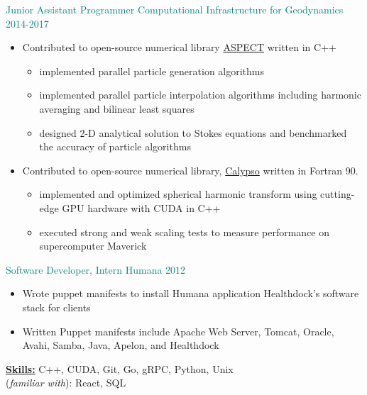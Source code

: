 \documentclass[11pt]{ltxdoc}
\begin{document}
	{\textcolor{teal}{Junior Assistant Programmer} \hfill \textcolor{teal}{Computational Infrastructure for Geodynamics} \hfill \textcolor{teal}{2014-2017}}

      \begin{itemize}
      	
        \item Contributed to open-source numerical library \href{https://github.com/geodynamics/aspect}{ASPECT} written in C++
        
            \begin{itemize}        
            	\item implemented parallel particle generation algorithms
            	\item implemented parallel particle interpolation algorithms including harmonic averaging and bilinear least squares
            	\item designed 2-D analytical solution to Stokes equations and benchmarked the accuracy of particle algorithms
			\end{itemize}
      
		\item Contributed to open-source numerical library,
		\href{https://geodynamics.org/cig/software/calypso/}{Calypso} written in Fortran 90.
  
         	\begin{itemize}
          		\item implemented and optimized spherical harmonic transform using cutting-edge GPU hardware with CUDA in C++
          		\item executed strong and weak scaling tests to measure performance on supercomputer Maverick
          	\end{itemize}
            
	\end{itemize}
    
	\textcolor{teal}{Software Developer, Intern} \hfill \textcolor{teal}{Humana} \hfill \textcolor{teal}{2012}
		
		\begin{itemize}
			\item Wrote puppet manifests to install Humana application Healthdock's software stack for clients
			\item Written Puppet manifests include Apache Web Server, Tomcat, Oracle, Avahi, Samba, Java, Apelon, and Healthdock
		\end{itemize}
	
\textbf{\underline{Skills:}} C++, CUDA, Git, Go, gRPC, Python, Unix \\
(\emph{familiar with}): React, SQL
\end{document}

